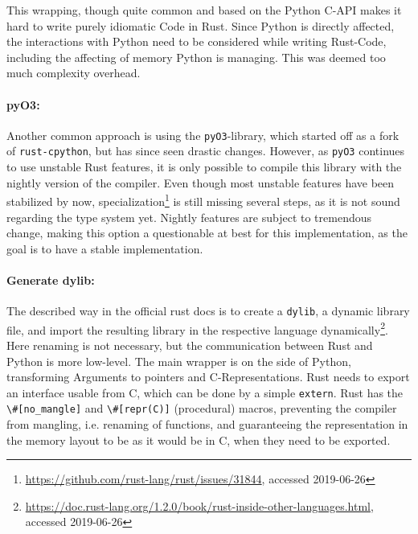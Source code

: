 
This wrapping, though quite common and based on the Python C-API makes
it hard to write purely idiomatic Code in Rust. Since Python is directly
affected, the interactions with Python need to be considered while writing
Rust-Code, including the affecting of memory Python is managing. This was
deemed too much complexity overhead.

\paragraph{pyO3:} Another common approach is using the \verb|pyO3|-library,
which started off as a fork of \verb|rust-cpython|, but has since seen drastic
changes. However, as \verb|pyO3| continues to use unstable Rust features, it is
only possible to compile this library with the nightly version of the compiler.
Even though most unstable features have been stabilized by now,
specialization\footnote{\url{https://github.com/rust-lang/rust/issues/31844},
accessed 2019-06-26} is still missing several steps, as it is not sound
regarding the type system yet. Nightly features are subject to tremendous
change, making this option a questionable at best for this implementation, as
the goal is to have a stable implementation.


\paragraph{Generate dylib:} The described way in the official rust docs is to
create a \verb|dylib|, a dynamic library file, and import the resulting library
in the respective language
dynamically\footnote{\url{https://doc.rust-lang.org/1.2.0/book/rust-inside-other-languages.html}, \\
accessed 2019-06-26}.  Here renaming is not necessary, but the
communication between Rust and Python is more low-level. The main wrapper
is on the side of Python, transforming Arguments to pointers and
C-Representations. Rust needs to export an interface usable from C, which can
be done by a simple \verb|extern|. Rust has the \verb!\#[no_mangle]! and
\verb!\#[repr(C)]! (procedural) macros, preventing the compiler from mangling,
i.e. renaming of functions, and guaranteeing the representation in the memory
layout to be as it would be in C, when they need to be exported.


